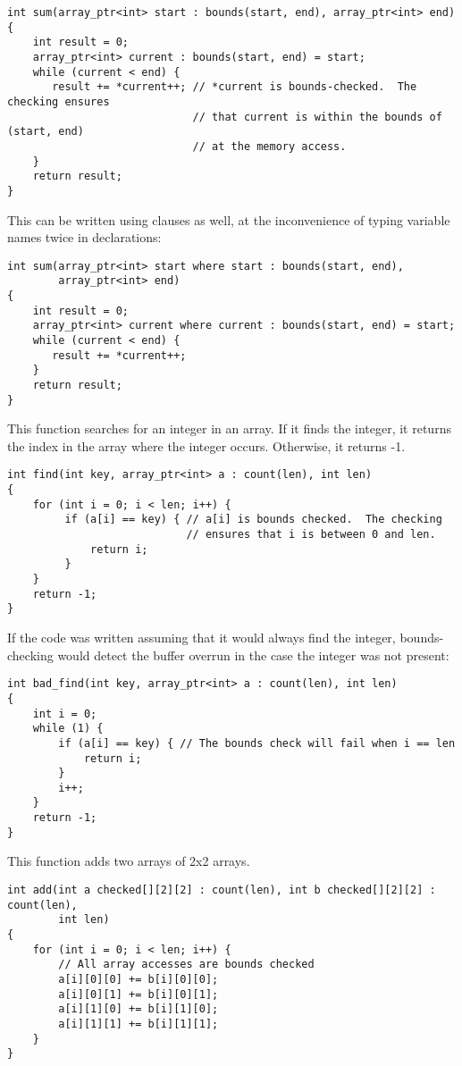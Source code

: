 \begin{lstlisting}
int sum(array_ptr<int> start : bounds(start, end), array_ptr<int> end)
{
    int result = 0;
    array_ptr<int> current : bounds(start, end) = start;
    while (current < end) {
       result += *current++; // *current is bounds-checked.  The checking ensures
                             // that current is within the bounds of (start, end)
                             // at the memory access.
    }
    return result;
}
\end{lstlisting}

This can be written using  clauses as well, at the
inconvenience of typing variable names twice in declarations:

\begin{lstlisting}
int sum(array_ptr<int> start where start : bounds(start, end),
        array_ptr<int> end)
{
    int result = 0;
    array_ptr<int> current where current : bounds(start, end) = start;
    while (current < end) {
       result += *current++;
    }
    return result;
}
\end{lstlisting}

This function searches for an integer in an array. If it finds the
integer, it returns the index in the array where the integer occurs.
Otherwise, it returns -1.

\begin{lstlisting}
int find(int key, array_ptr<int> a : count(len), int len)
{
    for (int i = 0; i < len; i++) {
         if (a[i] == key) { // a[i] is bounds checked.  The checking
                            // ensures that i is between 0 and len.
             return i;
         }
    }
    return -1;
}
\end{lstlisting}

If the code was written assuming that it would always find the integer,
bounds-checking would detect the buffer overrun in the case the integer
was not present:

\begin{lstlisting}
int bad_find(int key, array_ptr<int> a : count(len), int len)
{
    int i = 0;
    while (1) {
        if (a[i] == key) { // The bounds check will fail when i == len
            return i;
        }
        i++;
    }
    return -1;
}

\end{lstlisting}

This function adds two arrays of 2x2 arrays.

\begin{lstlisting}
int add(int a checked[][2][2] : count(len), int b checked[][2][2] : count(len),
        int len)
{
    for (int i = 0; i < len; i++) {
        // All array accesses are bounds checked
        a[i][0][0] += b[i][0][0];
        a[i][0][1] += b[i][0][1];
        a[i][1][0] += b[i][1][0];
        a[i][1][1] += b[i][1][1];
    }
}
\end{lstlisting}

